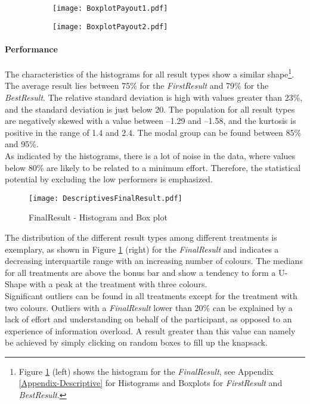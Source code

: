  \begin{figure}[htbp] %
\begin{center} 
  \caption{Distribution of payout among treatments for each Trial}
    \label{Distributionofpayout}
    \begin{subfigure} 
\centering
\texttt{[image: BoxplotPayout1.pdf]}
\end{subfigure} 
\begin{subfigure} 
\centering
  \texttt{[image: BoxplotPayout2.pdf]}
\end{subfigure}
\end{center}
\end{figure}
\paragraph{Performance}
\label{ch:Evaluation:sec:DescriptiveStatistics:subsec:Performance}
The characteristics of the histograms for all result types show a similar shape\footnote{Figure \ref{DistributionFinalResult} (left) shows the histogram for the \textit{FinalResult}, see Appendix \ref{Appendix-Descriptive} for Histograms and Boxplots for \textit{FirstResult} and \textit{BestResult}.}. The average result lies between 75\% for the \textit{FirstResult} and 79\% for the \textit{BestResult}. The relative standard deviation is high with values greater than 23\%, and the standard deviation is just below 20. 
The population for all result types are negatively skewed with a value between --1.29 and --1.58, and the kurtosis is positive in the range of 1.4 and 2.4. The modal group can be found between 85\% and 95\%.\\
As indicated by the histograms, there is a lot of noise in the data, where values below 80\% are likely to be related to a minimum effort. Therefore, the statistical potential by excluding the low performers is emphasized.

\begin{figure}[htbp] %
\begin{center} 
  \texttt{[image: DescriptivesFinalResult.pdf]}
  \caption{FinalResult - Histogram and Box plot}
    \label{DistributionFinalResult} 
\end{center}
\end{figure}


The distribution of the different result types among different treatments is exemplary, as shown in Figure \ref{DistributionFinalResult} (right) for the \textit{FinalResult} and indicates a decreasing interquartile range with an increasing number of colours. The medians for all treatments are above the bonus bar and show a tendency to form a U-Shape with a peak at the treatment with three colours.\\
Significant outliers can be found in all treatments except for the treatment with two colours. Outliers with a \textit{FinalResult} lower than 20\% can be explained by a lack of effort and understanding on behalf of the participant, as opposed to an experience of information overload. A result greater than this value can namely be achieved by simply clicking on random boxes to fill up the knapsack.

